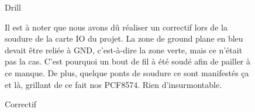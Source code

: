 \begin{figure}[hbtp]
\caption{Drill}
\centering
{}

\bigskip
\bigskip
\bigskip
\bigskip
\bigskip

\caption{Correctif}

\bigskip

\begin{flushleft}
Il est à noter que nous avons dû réaliser un correctif lors de la soudure de la carte IO du projet. La zone de ground plane en bleu devait être reliée à GND, c'est-à-dire la zone verte, mais ce n'était pas la cas. C'est pourquoi un bout de fil à été soudé afin de pailler à ce manque. De plus, quelque ponts de soudure ce sont manifestés ça et là, grillant de ce fait nos PCF8574. Rien d'insurmontable.
\end{flushleft}
\end{figure}